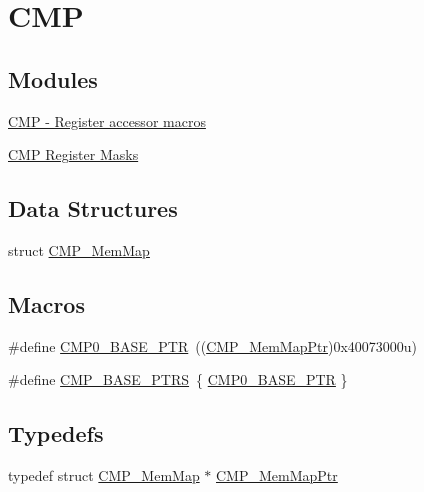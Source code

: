 \hypertarget{group___c_m_p___peripheral}{}\section{C\+M\+P}
\label{group___c_m_p___peripheral}
\subsection*{Modules}
\begin{DoxyCompactItemize}
\item 
\hyperlink{group___c_m_p___register___accessor___macros}{C\+M\+P -\/ Register accessor macros}
\item 
\hyperlink{group___c_m_p___register___masks}{C\+M\+P Register Masks}
\end{DoxyCompactItemize}
\subsection*{Data Structures}
\begin{DoxyCompactItemize}
\item 
struct \hyperlink{struct_c_m_p___mem_map}{C\+M\+P\+\_\+\+Mem\+Map}
\end{DoxyCompactItemize}
\subsection*{Macros}
\begin{DoxyCompactItemize}
\item 
\#define \hyperlink{group___c_m_p___peripheral_ga5a7a6b1d0743a05435ba5cb2dc2b3431}{C\+M\+P0\+\_\+\+B\+A\+S\+E\+\_\+\+P\+T\+R}~((\hyperlink{group___c_m_p___peripheral_ga6f5d370df3839e41b771c2d0b89cbb83}{C\+M\+P\+\_\+\+Mem\+Map\+Ptr})0x40073000u)
\item 
\#define \hyperlink{group___c_m_p___peripheral_gacc69654296499d45b2060956a3c8e97f}{C\+M\+P\+\_\+\+B\+A\+S\+E\+\_\+\+P\+T\+R\+S}~\{ \hyperlink{group___c_m_p___peripheral_ga5a7a6b1d0743a05435ba5cb2dc2b3431}{C\+M\+P0\+\_\+\+B\+A\+S\+E\+\_\+\+P\+T\+R} \}
\end{DoxyCompactItemize}
\subsection*{Typedefs}
\begin{DoxyCompactItemize}
\item 
typedef struct \hyperlink{struct_c_m_p___mem_map}{C\+M\+P\+\_\+\+Mem\+Map} $\ast$ \hyperlink{group___c_m_p___peripheral_ga6f5d370df3839e41b771c2d0b89cbb83}{C\+M\+P\+\_\+\+Mem\+Map\+Ptr}
\end{DoxyCompactItemize}


